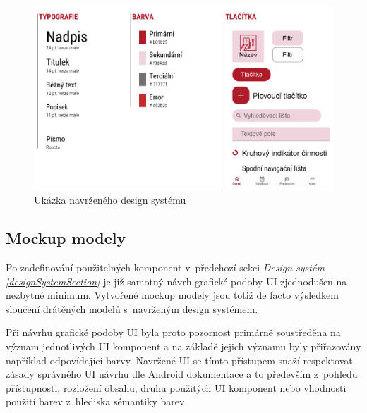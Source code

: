 \begin{figure}[H]
  \centering
  \includegraphics[width=.99\textwidth]{design_system.jpg}
  \caption{Ukázka navrženého design systému}
  \label{fig:design_system}
\end{figure}

\subsection{Mockup modely} \label{navrhMockupModelu}
Po zadefinování použitelných komponent v~předchozí sekci \textit{Design systém \ref{designSystemSection}} 
je již samotný návrh grafické podoby UI zjednodušen na nezbytné minimum. Vytvořené mockup modely jsou totiž de facto výsledkem sloučení drátěných modelů
 s~navrženým design systémem.

Při návrhu grafické podoby UI byla proto pozornost primárně soustředěna na význam jednotlivých UI komponent a na základě jejich významu byly
přiřazovány například odpovídající barvy. Navržené UI se tímto přístupem snaží respektovat zásady správného UI návrhu dle Android dokumentace 
a to především z~pohledu přístupnosti, rozložení obsahu, druhu použitých UI komponent nebo vhodnosti použití barev z~hlediska sémantiky barev.

